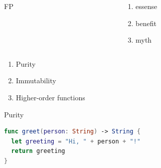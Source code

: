 \documentclass[aspectratio=169]{beamer}
\begin{document}
\begin{frame}
    \begin{columns}[c]
        \begin{column}[c]{2.5em}
            \HUGE
                FP
        \end{column}

        \begin{column}[c]{27em}
            \Huge
                \begin{enumerate}[ leftmargin=0.5em
                                 , itemsep=1em
                                 , labelsep=0.1em
                                 , label=\color{gray}\Roman*
                                 ]
                    \item [\KeyWord{\MVRightarrow}]\hspace{0.5em}essense
                    \item [\KeyWord{\MVRightarrow}]\hspace{0.5em}benefit
                    \item [\KeyWord{\MVRightarrow}]\hspace{0.5em}myth
                \end{enumerate}
        \end{column}
    \end{columns}
\end{frame}

\begin{frame}
    \centering
\end{frame}

\begin{frame}
    \Huge
        \begin{enumerate}[ leftmargin=1.5em
                         , itemsep=1em
                         , labelsep=0.5em
                         , label=\color{darkelectricblue}\Roman*
                         ]
            \item Purity
            \item Immutability
            \item Higher-order functions
        \end{enumerate}
\end{frame}

\begin{frame}[fragile,t]
    \vspace{0.8em}
    \Huge{Purity}

    \begin{lstlisting}[language=Swift]
func greet(person: String) -> String {
  let greeting = "Hi, " + person + "!"
  return greeting
}
    \end{lstlisting}
\end{frame}
\end{document}
